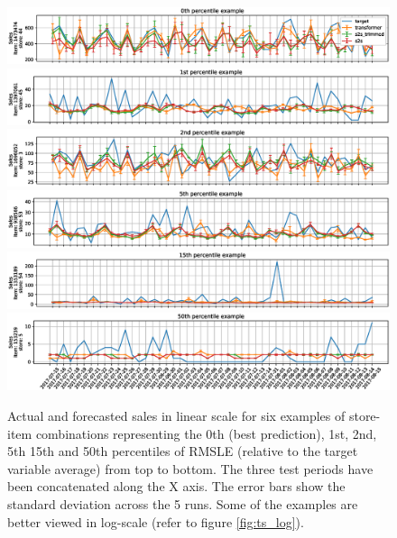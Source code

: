 \begin{figure}
\centering
\includegraphics[width=1\linewidth]{salesforecast/images/sample_0_lin}
\includegraphics[width=1\linewidth]{salesforecast/images/sample_1_lin}
\includegraphics[width=1\linewidth]{salesforecast/images/sample_2_lin}
\includegraphics[width=1\linewidth]{salesforecast/images/sample_3_lin}
\includegraphics[width=1\linewidth]{salesforecast/images/sample_4_lin}
\includegraphics[width=1\linewidth]{salesforecast/images/sample_5_lin}
\caption[Actual and forecasted sales timeseries examples in linear scale]{Actual and forecasted sales in linear scale for six examples of store-item combinations representing the 0th (best prediction), 1st, 2nd, 5th 15th and 50th percentiles of RMSLE (relative to the target variable average) from top to bottom. The three test periods have been concatenated along the X axis. The error bars show the standard deviation across the 5 runs. Some of the examples are better viewed in log-scale (refer to figure \ref{fig:ts_log}).}
\label{fig:ts_lin}
\end{figure}

